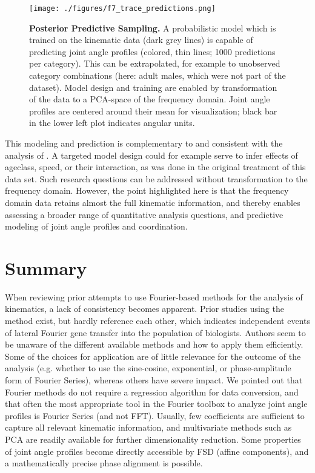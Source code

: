 \begin{figure}[pt]
\centering
\texttt{[image: ./figures/f7\_trace\_predictions.png]}
\caption{\label{fig:modelprediction}\textbf{Posterior Predictive Sampling.} A probabilistic model which is trained on the kinematic data (dark grey lines) is capable of predicting joint angle profiles (colored, thin lines; 1000 predictions per category). This can be extrapolated, for example to unobserved category combinations (here: adult males, which were not part of the dataset). Model design and training are enabled by transformation of the data to a PCA-space of the frequency domain. Joint angle profiles are centered around their mean for visualization; black bar in the lower left plot indicates angular units.}
\end{figure}


This modeling and prediction is complementary to and consistent with the analysis of \citet{Druelle2021}.
A targeted model design could for example serve to infer effects of ageclass, speed, or their interaction, as was done in the original treatment of this data set.
Such research questions can be addressed without transformation to the frequency domain.
However, the point highlighted here is that the frequency domain data retains almost the full kinematic information, and thereby enables assessing a broader range of quantitative analysis questions, and predictive modeling of joint angle profiles and coordination.

\FloatBarrier\clearpage
\section{Summary}
\label{summary}
When reviewing prior attempts to use Fourier-based methods for the analysis of kinematics, a lack of consistency becomes apparent.
Prior studies using the method exist, but hardly reference each other, which indicates independent events of lateral Fourier gene transfer into the population of biologists.
Authors seem to be unaware of the different available methods and how to apply them efficiently.
Some of the choices for application are of little relevance for the outcome of the analysis (e.g. whether to use the sine-cosine, exponential, or phase-amplitude form of Fourier Series), whereas others have severe impact.
We pointed out that Fourier methods do not require a regression algorithm for data conversion, and that often the most appropriate tool in the Fourier toolbox to analyze joint angle profiles is Fourier Series (and not FFT).
Usually, few coefficients are sufficient to capture all relevant kinematic information, and multivariate methods such as PCA are readily available for further dimensionality reduction.
Some properties of joint angle profiles become directly accessible by FSD (affine components), and a mathematically precise phase alignment is possible.

